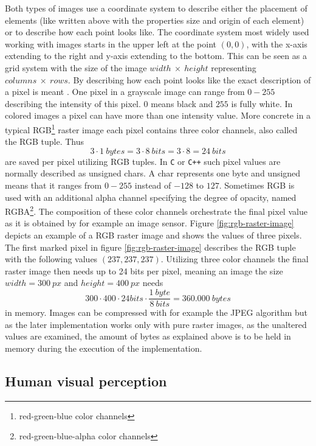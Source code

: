 \noindent Both types of images use a coordinate system to describe either the placement of elements (like written above with the properties size and origin of each element) or to describe how each point looks like.
The coordinate system most widely used working with images starts in the upper left at the point $(0,0)$, with the x-axis extending to the right and y-axis extending to the bottom.
This can be seen as a grid system with the size of the image $width\ \times\ height$ representing $columns\ \times\ rows$.
By describing how each point looks like the exact description of a pixel is meant \citep{shirley2009fundamentals}.
\newline\newline\noindent One pixel in a grayscale image can range from $0 - 255$ describing the intensity of this pixel.
$0$ means black and $255$ is fully white.
In colored images a pixel can have more than one intensity value.
More concrete in a typical RGB\footnote{red-green-blue color channels} raster image each pixel contains three color channels, also called the RGB tuple.
Thus $$3 \cdot 1\ bytes = 3 \cdot 8\ bits = 3 \cdot 8 = 24\ bits$$ are saved per pixel utilizing RGB tuples.
In \texttt{C} or \texttt{C++} such pixel values are normally described as unsigned chars. A char represents one byte and unsigned means that it ranges from $0 - 255$ instead of $-128$ to $127$.
Sometimes RGB is used with an additional alpha channel specifying the degree of opacity, named RGBA\footnote{red-green-blue-alpha color channels}.
The composition of these color channels orchestrate the final pixel value as it is obtained by for example an image sensor.
Figure \ref{fig:rgb-raster-image} depicts an example of a RGB raster image and shows the values of three pixels.
The first marked pixel in figure \ref{fig:rgb-raster-image} describes the RGB tuple with the following values $(237,237,237)$.
Utilizing three color channels the final raster image then needs up to 24 bits per pixel, meaning an image the size $width = 300\ px$ and $height = 400\ px$ needs $$300 \cdot 400 \cdot 24bits \cdot \frac{1\ byte}{8\ bits} = 360.000\ bytes$$ in memory.
Images can be compressed with for example the JPEG algorithm but as the later implementation works only with pure raster images, as the unaltered values are examined, the amount of bytes as explained above is to be held in memory during the execution of the implementation.

\subsection*{Human visual perception}

